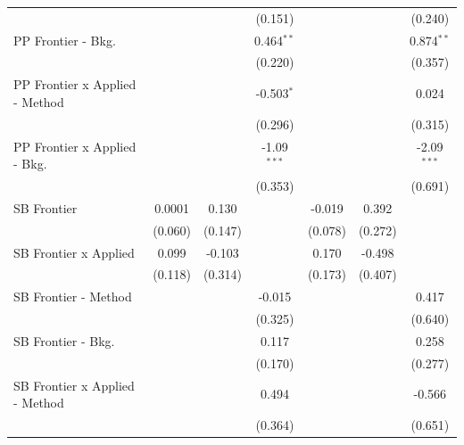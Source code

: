 \begin{tabular}{lcccccc}
                                  &                &             & (0.151)       &         &               & (0.240)\\   
   PP Frontier - Bkg.             &                &             & 0.464$^{**}$  &         &               & 0.874$^{**}$\\   
                                  &                &             & (0.220)       &         &               & (0.357)\\   
   PP Frontier x Applied - Method &                &             & -0.503$^{*}$  &         &               & 0.024\\   
                                  &                &             & (0.296)       &         &               & (0.315)\\   
   PP Frontier x Applied - Bkg.   &                &             & -1.09$^{***}$ &         &               & -2.09$^{***}$\\   
                                  &                &             & (0.353)       &         &               & (0.691)\\   
   SB Frontier                    & 0.0001         & 0.130       &               & -0.019  & 0.392         &   \\   
                                  & (0.060)        & (0.147)     &               & (0.078) & (0.272)       &   \\   
   SB Frontier x Applied          & 0.099          & -0.103      &               & 0.170   & -0.498        &   \\   
                                  & (0.118)        & (0.314)     &               & (0.173) & (0.407)       &   \\   
   SB Frontier - Method           &                &             & -0.015        &         &               & 0.417\\   
                                  &                &             & (0.325)       &         &               & (0.640)\\   
   SB Frontier - Bkg.             &                &             & 0.117         &         &               & 0.258\\   
                                  &                &             & (0.170)       &         &               & (0.277)\\   
   SB Frontier x Applied - Method &                &             & 0.494         &         &               & -0.566\\   
                                  &                &             & (0.364)       &         &               & (0.651)\\   

\end{tabular}
